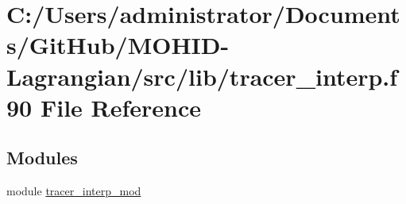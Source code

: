 \hypertarget{tracer__interp_8f90}{}\section{C\+:/\+Users/administrator/\+Documents/\+Git\+Hub/\+M\+O\+H\+I\+D-\/\+Lagrangian/src/lib/tracer\+\_\+interp.f90 File Reference}
\label{tracer__interp_8f90}
\subsection*{Modules}
\begin{DoxyCompactItemize}
\item 
module \hyperlink{namespacetracer__interp__mod}{tracer\+\_\+interp\+\_\+mod}
\end{DoxyCompactItemize}

